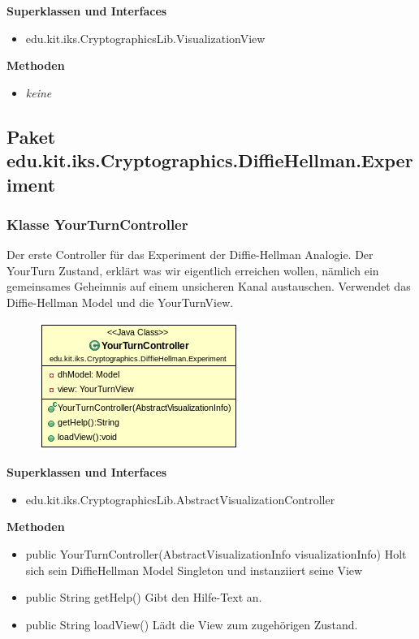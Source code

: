 \documentclass{article}
\begin{document}
      \textbf{Superklassen und Interfaces}
      \begin{itemize}
        \item edu.kit.iks.CryptographicsLib.VisualizationView
      \end{itemize}

      \textbf{Methoden}
      \begin{itemize}
        \item \textit{keine}
      \end{itemize}

\subsection{Paket edu.kit.iks.Cryptographics.DiffieHellman.Experiment}

\subsubsection{Klasse YourTurnController}
      Der erste Controller für das Experiment der Diffie-Hellman Analogie.
      Der YourTurn Zustand, erklärt was wir eigentlich erreichen wollen,
      nämlich ein gemeinsames Geheimnis auf einem unsicheren Kanal austauschen.
      Verwendet das Diffie-Hellman Model und die YourTurnView.

      \begin{figure}[H]
        \centering
        \includegraphics{resources/edu-kit-iks-Cryptographics-DiffieHellman-Experiment-YourTurnController}
      \end{figure}

      \textbf{Superklassen und Interfaces}
      \begin{itemize}
        \item edu.kit.iks.CryptographicsLib.AbstractVisualizationController
      \end{itemize}

      \textbf{Methoden}
      \begin{itemize}
          \item public YourTurnController(AbstractVisualizationInfo visualizationInfo) \newline
              Holt sich sein DiffieHellman Model Singleton und instanziiert seine View
        \item public String getHelp() \newline
        Gibt den Hilfe-Text an.
        \item public String loadView() \newline
        Lädt die View zum zugehörigen Zustand.
      \end{itemize}
\end{document}
